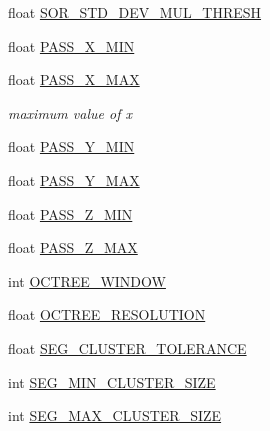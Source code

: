 \begin{DoxyCompactItemize}
\item 
float \hyperlink{classdatmo_1_1cloud__segmentation_ae1c32b9f5741dd7d212f2745f8784de0}{S\+O\+R\+\_\+\+S\+T\+D\+\_\+\+D\+E\+V\+\_\+\+M\+U\+L\+\_\+\+T\+H\+R\+E\+SH}
\item 
float \hyperlink{classdatmo_1_1cloud__segmentation_a503bba212f9c15b767d512771b1559c2}{P\+A\+S\+S\+\_\+\+X\+\_\+\+M\+IN}
\item 
float \hyperlink{classdatmo_1_1cloud__segmentation_a12f8209c6640d67c23cac18b2d8b7964}{P\+A\+S\+S\+\_\+\+X\+\_\+\+M\+AX}
\begin{DoxyCompactList}\small\item\em maximum value of x \end{DoxyCompactList}\item 
float \hyperlink{classdatmo_1_1cloud__segmentation_af95645fb925c485f397321d6e07c4574}{P\+A\+S\+S\+\_\+\+Y\+\_\+\+M\+IN}
\item 
float \hyperlink{classdatmo_1_1cloud__segmentation_abacc76df1e25e42d25c1822c2637fa00}{P\+A\+S\+S\+\_\+\+Y\+\_\+\+M\+AX}
\item 
float \hyperlink{classdatmo_1_1cloud__segmentation_acb71ade7e486ad1cafe15c441903f3e0}{P\+A\+S\+S\+\_\+\+Z\+\_\+\+M\+IN}
\item 
float \hyperlink{classdatmo_1_1cloud__segmentation_a05b70936af05654abb9b1924ab593d08}{P\+A\+S\+S\+\_\+\+Z\+\_\+\+M\+AX}
\item 
int \hyperlink{classdatmo_1_1cloud__segmentation_ada1c6bd7f69249c5317cbe95969498e4}{O\+C\+T\+R\+E\+E\+\_\+\+W\+I\+N\+D\+OW}
\item 
float \hyperlink{classdatmo_1_1cloud__segmentation_aba086f9f8e05f18c02c042c057854a06}{O\+C\+T\+R\+E\+E\+\_\+\+R\+E\+S\+O\+L\+U\+T\+I\+ON}
\item 
float \hyperlink{classdatmo_1_1cloud__segmentation_af33add7f3b00fac5be10ffd87eae057f}{S\+E\+G\+\_\+\+C\+L\+U\+S\+T\+E\+R\+\_\+\+T\+O\+L\+E\+R\+A\+N\+CE}
\item 
int \hyperlink{classdatmo_1_1cloud__segmentation_acf7cfcaf0ab08a2afffcc2b47048bc81}{S\+E\+G\+\_\+\+M\+I\+N\+\_\+\+C\+L\+U\+S\+T\+E\+R\+\_\+\+S\+I\+ZE}
\item 
int \hyperlink{classdatmo_1_1cloud__segmentation_ab2959ad226faeaab4910f42ba91d37cb}{S\+E\+G\+\_\+\+M\+A\+X\+\_\+\+C\+L\+U\+S\+T\+E\+R\+\_\+\+S\+I\+ZE}
\end{DoxyCompactItemize}
